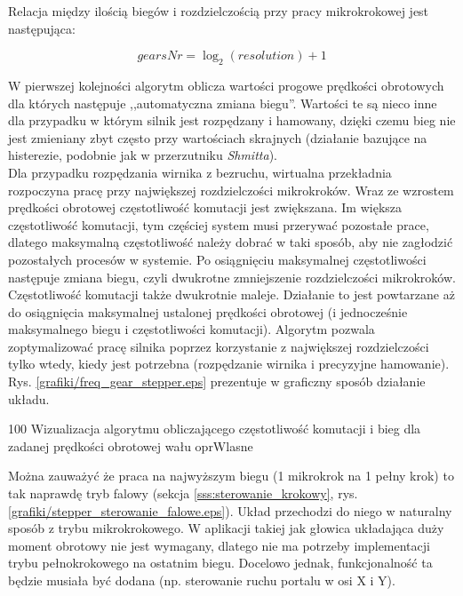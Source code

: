 Relacja między ilością biegów i rozdzielczością przy pracy mikrokrokowej jest następująca:

\begin{equation} \label{eq:pid7}
	gearsNr = \log_2(resolution) + 1
\end{equation}

W pierwszej kolejności algorytm oblicza wartości progowe prędkości obrotowych dla których następuje ,,automatyczna zmiana biegu''. Wartości te są nieco inne dla przypadku w którym silnik jest rozpędzany i hamowany, dzięki czemu bieg nie jest zmieniany zbyt często przy wartościach skrajnych (działanie bazujące na histerezie, podobnie jak w przerzutniku {\it Shmitta}). \\

Dla przypadku rozpędzania wirnika z bezruchu, wirtualna przekładnia rozpoczyna pracę przy największej rozdzielczości mikrokroków. Wraz ze wzrostem prędkości obrotowej częstotliwość komutacji jest zwiększana. Im większa częstotliwość komutacji, tym częściej system musi przerywać pozostałe prace, dlatego maksymalną częstotliwość należy dobrać w taki sposób, aby nie zagłodzić pozostałych procesów w systemie. Po osiągnięciu maksymalnej częstotliwości następuje zmiana biegu, czyli dwukrotne zmniejszenie rozdzielczości mikrokroków. Częstotliwość komutacji także dwukrotnie maleje. Działanie to jest powtarzane aż do osiągnięcia maksymalnej ustalonej prędkości obrotowej (i jednocześnie maksymalnego biegu i częstotliwości komutacji). Algorytm pozwala zoptymalizować pracę silnika poprzez korzystanie z największej rozdzielczości tylko wtedy, kiedy jest potrzebna (rozpędzanie wirnika i precyzyjne hamowanie). Rys. \ref{grafiki/freq_gear_stepper.eps} prezentuje w graficzny sposób działanie układu.

	{100}
	{Wizualizacja algorytmu obliczającego częstotliwość komutacji i bieg dla zadanej prędkości obrotowej wału}
	{oprWlasne}
	
Można zauważyć że praca na najwyższym biegu (1 mikrokrok na 1 pełny krok) to tak naprawdę tryb falowy (sekcja \ref{sss:sterowanie_krokowy}, rys. \ref{grafiki/stepper_sterowanie_falowe.eps}). Układ przechodzi do niego w naturalny sposób z trybu mikrokrokowego. W aplikacji takiej jak głowica układająca duży moment obrotowy nie jest wymagany, dlatego nie ma potrzeby implementacji trybu pełnokrokowego na ostatnim biegu. Docelowo jednak, funkcjonalność ta będzie musiała być dodana (np. sterowanie ruchu portalu w osi X i Y).

